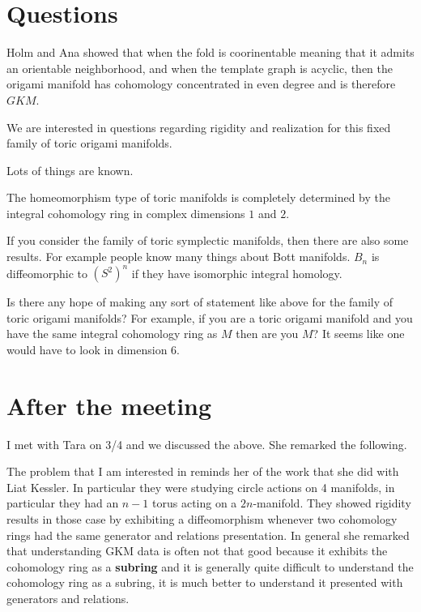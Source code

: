 \documentclass[12pt]{article}
\begin{document}

\section{Questions}
Holm and Ana showed that when the fold is 
coorinentable meaning that it admits an orientable neighborhood, and when the template graph is acyclic,
then the origami manifold has cohomology concentrated in even degree 
and is therefore $GKM$.

\hfill

We are interested in questions regarding rigidity and realization for this
fixed family of toric origami manifolds.

\hfill

Lots of things are known.

The homeomorphism type of toric manifolds is completely determined by
the integral cohomology ring in complex dimensions $1$ and $2$.

If you consider the family of toric symplectic manifolds, then there are also some results. 
For example people know many things about Bott manifolds. $B_n$ is diffeomorphic to $(S^2)^n$ if
they have isomorphic integral homology.

\hfill

Is there any hope of making any sort of statement like above for the family of toric origami manifolds?
For example, if you are a toric origami manifold and you have the same integral cohomology ring as $M$
then are you $M$? It seems like one would have to look in dimension $6$.

\section{After the meeting}
I met with Tara on 3/4 and we discussed the above. She remarked the following.

\hfill

The problem that I am interested in reminds her of the work that she did with Liat Kessler. In particular they were studying circle actions on 4 manifolds, 
in particular they had an $n-1$ torus acting on a $2n$-manifold. They showed rigidity results in those case by exhibiting a diffeomorphism whenever two cohomology rings
had the same generator and relations presentation. In general she remarked that understanding GKM data is often not that good because it exhibits the cohomology ring 
as a \textbf{subring} and it is generally quite difficult to understand the cohomology ring as a subring, it is much better to understand it presented with generators and relations.
\end{document}
